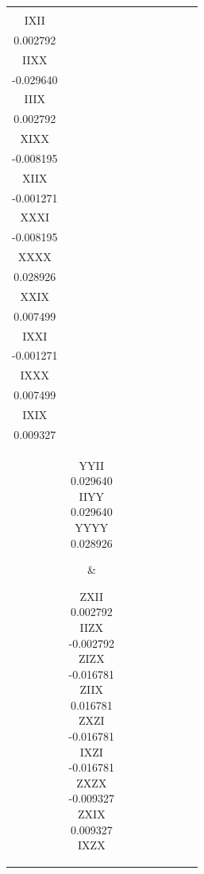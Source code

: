 \documentclass[twocolumn]{revtex4-1}
\newcommand{\1}{\mathbbm{1}}
\begin{document}
\begin{longtable}{|c|c|c|c|c|c|c|c|c|}
{-0.029640\\ 
IXII\\
0.002792\\ 
IIXX\\
-0.029640\\ 
IIIX\\
0.002792\\ 
XIXX\\
-0.008195\\ 
XIIX\\
-0.001271\\ 
XXXI\\
-0.008195\\ 
XXXX\\
0.028926\\ 
XXIX\\
0.007499\\ 
IXXI\\
-0.001271\\ 
IXXX\\
0.007499\\ 
IXIX\\
0.009327\\ 
\vspace{.5\baselineskip}}
&
\parbox{1.9cm}{\centering\vspace{.5\baselineskip}
YYII\\
0.029640\\ 
IIYY\\
0.029640\\ 
YYYY\\
0.028926\\ 
\vspace{.5\baselineskip}}
&
\parbox{1.9cm}{\centering\vspace{.5\baselineskip}
ZXII\\
0.002792\\ 
IIZX\\
-0.002792\\ 
ZIZX\\
-0.016781\\ 
ZIIX\\
0.016781\\ 
ZXZI\\
-0.016781\\ 
IXZI\\
-0.016781\\ 
ZXZX\\
-0.009327\\ 
ZXIX\\
0.009327\\ 
IXZX\\
}
\end{longtable}
\end{document}
